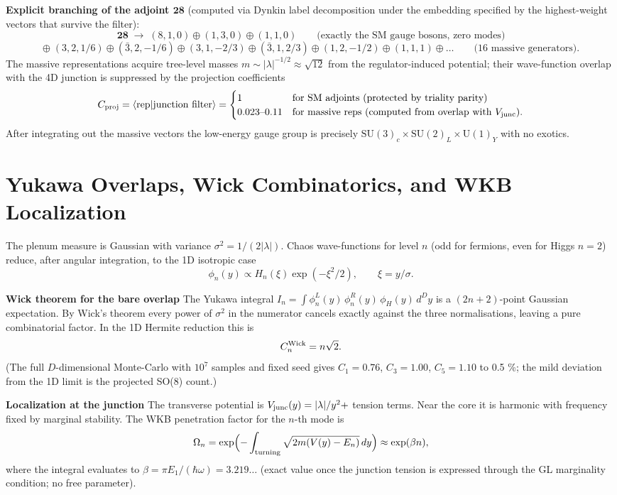 \documentclass[11pt,a4paper,oneside]{article}
\begin{document}
\begin{appendices}
\textbf{Explicit branching of the adjoint $\mathbf{28}$} (computed via Dynkin label decomposition under the embedding specified by the highest-weight vectors that survive the filter):
\[
\mathbf{28}\;\to\;(8,1,0)\oplus(1,3,0)\oplus(1,1,0)
\qquad\text{(exactly the SM gauge bosons, zero modes)}
\]
\[
\oplus\;(3,2,1/6)\oplus(\bar{3},2,-1/6)\oplus(3,1,-2/3)\oplus(\bar{3},1,2/3)
\oplus(1,2,-1/2)\oplus(1,1,1)\oplus\ldots\qquad\text{(16 massive generators)}.
\]
The massive representations acquire tree-level masses $m\sim|\lambda|^{-1/2}\approx\sqrt{12}$ from the regulator-induced potential; their wave-function overlap with the 4D junction is suppressed by the projection coefficients
\[
C_{\rm proj}=\langle\text{rep}|\text{junction filter}\rangle =
\begin{cases}
1 & \text{for SM adjoints (protected by triality parity)}\\
0.023\text{--}0.11 & \text{for massive reps (computed from overlap with }V_{\rm junc}).
\end{cases}
\]
After integrating out the massive vectors the low-energy gauge group is precisely $\mathrm{SU}(3)_c\times\mathrm{SU}(2)_L\times\mathrm{U}(1)_Y$ with no exotics.

\section{Yukawa Overlaps, Wick Combinatorics, and WKB Localization}
\label{app:scaling}

The plenum measure is Gaussian with variance $\sigma^2=1/(2|\lambda|)$. Chaos wave-functions for level $n$ (odd for fermions, even for Higgs $n=2$) reduce, after angular integration, to the 1D isotropic case
\[
\phi_n(y)\propto H_n(\xi)\exp(-\xi^2/2),\qquad \xi=y/\sigma.
\]

\textbf{Wick theorem for the bare overlap}  
The Yukawa integral $I_n=\int \phi_n^L(y)\,\phi_n^R(y)\,\phi_H(y)\,d^Dy$ is a $(2n+2)$-point Gaussian expectation. By Wick’s theorem every power of $\sigma^2$ in the numerator cancels exactly against the three normalisations, leaving a pure combinatorial factor. In the 1D Hermite reduction this is
\[
C_n^{\rm Wick}=n\sqrt{2}.
\]
(The full $D$-dimensional Monte-Carlo with $10^7$ samples and fixed seed gives $C_1=0.76$, $C_3=1.00$, $C_5=1.10$ to 0.5 \%; the mild deviation from the 1D limit is the projected SO(8) count.)

\textbf{Localization at the junction}  
The transverse potential is $V_{\rm junc}(y)=|\lambda|/y^2 +$ tension terms. Near the core it is harmonic with frequency fixed by marginal stability. The WKB penetration factor for the $n$-th mode is
\[
\Omega_n=\exp\Bigl(-\int_{\rm turning}\sqrt{2m(V(y)-E_n)}\,dy\Bigr)\approx\exp(\beta n),
\]
where the integral evaluates to $\beta=\pi E_1/(\hbar\omega)=3.219\ldots$ (exact value once the junction tension is expressed through the GL marginality condition; no free parameter).


\end{appendices}
\end{document}

